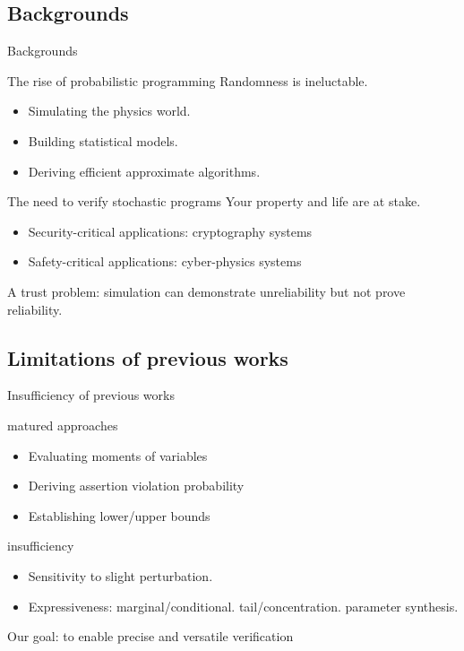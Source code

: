 \documentclass[8pt]{beamer}
\begin{document}
\subsection{Backgrounds}
\begin{frame}{Backgrounds}
	\begin{block}{The rise of probabilistic programming}
		Randomness is ineluctable.
		\begin{itemize}
			\item Simulating the physics world.
			\item Building statistical models.
			\item Deriving efficient approximate algorithms.
		\end{itemize}
	\end{block}
	\begin{block}{The need to verify stochastic programs}
		Your property and life are at stake.
		\begin{itemize}
			\item Security-critical applications: cryptography systems
			\item Safety-critical applications: cyber-physics systems
		\end{itemize}
		A trust problem: simulation can demonstrate unreliability but not prove reliability.
	\end{block}
\end{frame}
\subsection{Limitations of previous works}
\begin{frame}{Insufficiency of previous works}
	\begin{exampleblock}{matured approaches}
		\begin{itemize}
			\item Evaluating moments of variables\cite{wang2021central}
			\item Deriving assertion violation probability\cite{assert}
			\item Establishing lower/upper bounds\cite{probana}
		\end{itemize}
	\end{exampleblock}
	\begin{block}{insufficiency}
		\begin{itemize}
			\item Sensitivity to slight perturbation.
			\item Expressiveness: marginal/conditional. tail/concentration. parameter synthesis.
		\end{itemize}
	\end{block}

	Our goal: to enable precise and versatile verification
\end{frame}
\end{document}
